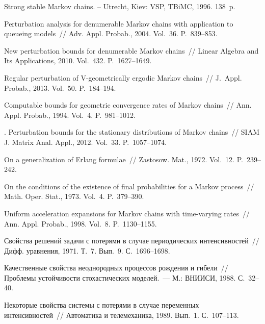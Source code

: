 \begin{multicols}{2}
{{\begin{thebibliography}{99}
  Strong stable Markov chains. -- Utrecht, Kiev: VSP, TBiMC, 1996. 138~p.

Perturbation analysis for denumerable Markov chains with application
to queueing models~// Adv. Appl. Probab., 2004. Vol.~36.
P.~839--853.

  New perturbation
bounds for denumerable Markov chains~//  Linear Algebra and Its Applications, 2010.
Vol.~432. P.~1627--1649.

 Regular perturbation of\linebreak
V-geometrically ergodic Markov chains~// J.~Appl. Probab., 2013. Vol.~50. P.~184--194.



 Computable bounds for geometric convergence
rates of Markov chains~// Ann. Appl. Probab.,
1994. Vol.~4. P.~981--1012.

.  Perturbation bounds for the stationary distributions
of Markov chains~// SIAM J. Matrix Anal.  Appl.,
2012. Vol.~33. P.~1057--1074.

 On a generalization of Erlang formulae~// Zastosow. Mat., 1972.
Vol.~12. P.~239--242.

 On the conditions of the existence of final probabilities for a Markov process~//
Math. Oper. Stat., 1973. Vol.~4. P.~379--390.



  Uniform acceleration expansions for Markov
chains with time-varying rates~// Ann. Appl. Probab., 1998. Vol.~8. P.~1130--1155.

 Свойства решений задачи с потерями
в случае периодических интенсивностей~// Дифф. уравнения, 1971. Т.~7. Вып.~9. С.~1696--1698.

  Качественные свойства неоднородных процессов рождения и гибели~//
Проб\-ле\-мы устойчивости стохастических моделей.~--- М.: ВНИИСИ, 1988. С.~32--40.

  Некоторые свойства сис\-те\-мы
с потерями в случае переменных интенсивностей~// Автоматика и телемеханика, 1989. Вып.~1. С.~107--113.


\end{thebibliography}}}
\end{multicols}
